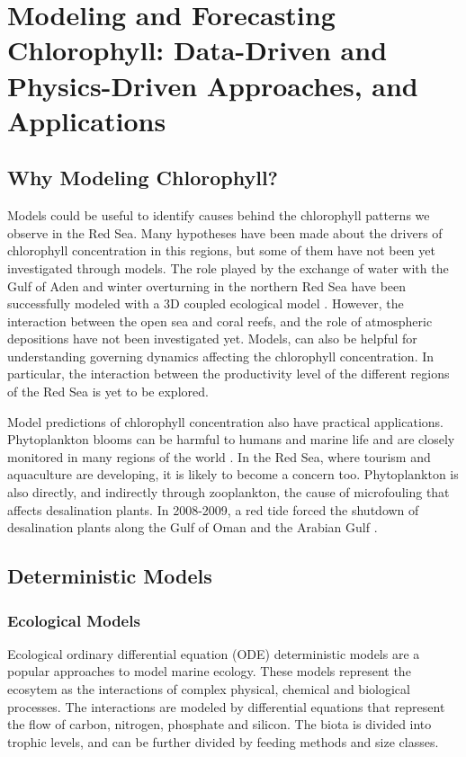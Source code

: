 \section{Modeling and Forecasting Chlorophyll: Data-Driven and Physics-Driven
Approaches, and Applications}

\subsection{Why Modeling Chlorophyll?}

Models could be useful to identify causes behind the chlorophyll patterns we
observe in the Red Sea. Many hypotheses have been made about the drivers of
chlorophyll concentration in this regions, but some of them have not been yet
investigated through models. The role played by the exchange of water with the
Gulf of Aden and winter overturning in the northern Red Sea have been
successfully modeled with a 3D coupled ecological model
\citep{Triantafyllou2014}. However, the interaction between the open sea and
coral reefs, and the role of atmospheric depositions have not been investigated
yet. Models, can also be helpful for understanding governing dynamics affecting
the chlorophyll concentration. In particular, the interaction between the
productivity level of the different regions of the Red Sea is yet to be
explored.

Model predictions of chlorophyll concentration also have practical
applications. Phytoplankton blooms can be harmful to humans and marine life and
are closely monitored in many regions of the world \citep{Pettersson2013}. In
the Red Sea, where tourism and aquaculture are developing, it is likely to
become a concern too. Phytoplankton is also directly, and indirectly through
zooplankton, the cause of microfouling that affects desalination plants. In
2008-2009, a red tide forced the shutdown of desalination plants along the Gulf
of Oman and the Arabian Gulf \citep{Richlen2010}.


\subsection{Deterministic Models}

\subsubsection{Ecological Models}

Ecological ordinary differential equation (ODE) deterministic models are a
popular approaches to model marine ecology. These models represent the ecosytem
as the interactions of complex physical, chemical and biological processes. The
interactions are modeled by differential equations that represent the flow of
carbon, nitrogen, phosphate and silicon. The biota is divided into trophic
levels, and can be further divided by feeding methods and size classes.

